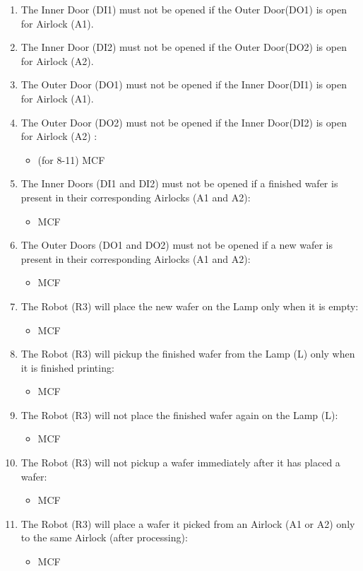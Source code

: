 \documentclass[a4paper,12pt]{article}
\begin{document}
\begin{enumerate}
\item The Inner Door (DI1) must not be opened if the Outer Door(DO1) is open for Airlock (A1).
\item The Inner Door (DI2) must not be opened if the Outer Door(DO2) is open for Airlock (A2).
\item The Outer Door (DO1) must not be opened if the Inner Door(DI1) is open for Airlock (A1).
\item The Outer Door (DO2) must not be opened if the Inner Door(DI2) is open for Airlock (A2) :
\begin{itemize}
	\item (for 8-11) MCF
	\end{itemize}
\item The Inner Doors (DI1 and DI2) must not be opened if a finished wafer is present in their corresponding Airlocks (A1 and A2):
    \begin{itemize}
	\item MCF
	\end{itemize}
\item The Outer Doors (DO1 and DO2) must not be opened if a new wafer is present in their corresponding Airlocks (A1 and A2):
    \begin{itemize}
	\item MCF
	\end{itemize}
\item The Robot (R3) will place the new wafer on the Lamp only when it is empty:
    \begin{itemize}
	\item MCF
	\end{itemize}
\item The Robot (R3) will pickup the finished wafer from the Lamp (L) only when it is finished printing:
    \begin{itemize}
	\item MCF
	\end{itemize}
\item The Robot (R3) will not place the finished wafer again on the Lamp (L):
    \begin{itemize}
	\item MCF
	\end{itemize}
\item The Robot (R3) will not pickup a wafer immediately after it has placed a wafer:
    \begin{itemize}
	\item MCF
	\end{itemize}
\item The Robot (R3) will place a wafer it picked from an Airlock (A1 or A2) only to the same Airlock (after processing):
    \begin{itemize}
	\item MCF
	\end{itemize}
	
\end{enumerate}
\newpage
\end{document}
